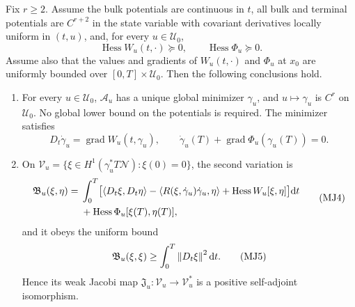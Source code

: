 \begin{theorem}
\label{thm:global-mobius-jacobi}
Fix \(r\ge2\).  Assume the bulk potentials are continuous in \(t\), all bulk
and terminal potentials are \(C^{r+2}\) in the state variable with covariant
derivatives locally uniform in \((t,u)\), and, for every
\(u\in\mathcal U_0\),
\begin{equation}
  \operatorname{Hess}W_u(t,\cdot)\succeq0,
  \qquad
  \operatorname{Hess}\Phi_u\succeq0.
  \tag{MJ2}
\end{equation}
Assume also that the values and gradients of \(W_u(t,\cdot)\) and \(\Phi_u\)
at \(x_0\) are uniformly bounded over \([0,T]\times\mathcal U_0\).
Then the following conclusions hold.

\begin{enumerate}[leftmargin=*,itemsep=0.35em]
  \item For every \(u\in\mathcal U_0\), \(\mathcal A_u\) has a unique global
  minimizer \(\gamma_u\), and \(u\mapsto\gamma_u\) is \(C^r\) on
  \(\mathcal U_0\).  No global lower bound on the potentials is required.
  The minimizer satisfies
  \begin{equation}
    D_t\dot\gamma_u=\operatorname{grad}W_u(t,\gamma_u),
    \qquad
    \dot\gamma_u(T)+\operatorname{grad}\Phi_u(\gamma_u(T))=0.
    \tag{MJ3}
  \end{equation}

  \item On
  \(\mathcal V_u=\{\xi\in H^1(\gamma_u^*T\mathcal N):\xi(0)=0\}\), the
  second variation is
  \begin{equation}
  \begin{aligned}
    \mathfrak B_u(\xi,\eta)
    ={}&\int_0^T\bigl[
    \left\langle D_t\xi,D_t\eta\right\rangle
    -\left\langle R(\xi,\dot\gamma_u)\dot\gamma_u,\eta\right\rangle
    +\operatorname{Hess}W_u[\xi,\eta]\bigr]\mathrm d t\\
    &+\operatorname{Hess}\Phi_u[\xi(T),\eta(T)],
  \end{aligned}
  \tag{MJ4}
  \end{equation}
  and it obeys the uniform bound
  \begin{equation}
    \mathfrak B_u(\xi,\xi)
    \ge\int_0^T\left\lVert D_t\xi\right\rVert^2\mathrm d t.
    \tag{MJ5}
  \end{equation}
  Hence its weak Jacobi map
  \(\mathfrak J_u:\mathcal V_u\to\mathcal V_u^*\) is a positive
  self-adjoint isomorphism.


\end{enumerate}
\end{theorem}
